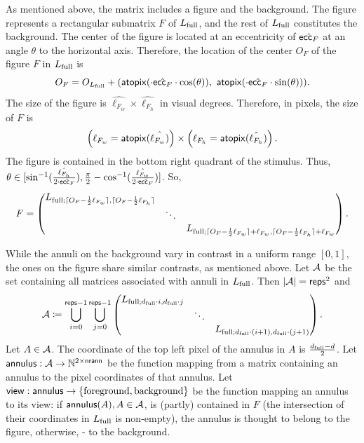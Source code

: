 As mentioned above, the matrix includes a figure and the background. The figure represents a rectangular submatrix $F$ of $L_{\mathrm{full}}$, and the rest of $L_{\mathrm{full}}$ constitutes the background. The center of the figure is located at an eccentricity of $\hat{\mathsf{ecc}_F}$ at an angle $\theta$ to the horizontal axis.
Therefore, the location of the center $O_F$ of the figure $F$ in $L_{\mathrm{full}}$ is
\begin{equation}
    O_F = O_{L_{\mathrm{full}}} + (\mathsf{atopix}( \cdot \hat{\mathsf{ecc}_F} \cdot \cos(\theta)), \ \mathsf{atopix}( \cdot \hat{\mathsf{ecc}_F} \cdot \sin(\theta))).
\end{equation}
The size of the figure is $\hat{\ell_{F_w}} \times \hat{\ell_{F_h}}$ in visual degrees. Therefore, in pixels, the size of $F$ is
\begin{equation}
    \left( \ell_{F_w} = \mathsf{atopix}(\hat{\ell_{F_w})} \right) \times \left( \ell_{F_h} = \mathsf{atopix}(\hat{\ell_{F_h}}) \right).
\end{equation}
The figure is contained in the bottom right quadrant of the stimulus. Thus, $\theta \in [\sin^{-1} (\frac{\hat{\ell_{F_h}}}{2 \cdot \hat{\mathsf{ecc}_F}}), \frac{\pi}{2} - \cos^{-1} (\frac{\hat{\ell_{F_w}}}{2 \cdot \hat{\mathsf{ecc}_F}})]$.  So,
\begin{equation}
    F =
    \begin{pmatrix}
        L_{\mathrm{full}; \lceil O_F - \frac{1}{2} \ell_{F_w}\rceil,  \lceil O_F - \frac{1}{2} \ell_{F_h}\rceil} &  &  \\
         & \ddots &  \\
         &  & L_{\mathrm{full}; \lceil O_F - \frac{1}{2} \ell_{F_w}\rceil + \ell_{F_w},  \lceil O_F - \frac{1}{2} \ell_{F_h}\rceil + \ell_{F_w}}
    \end{pmatrix}.
\end{equation}

While the annuli on the background vary in contrast in a uniform range $[0, 1]$, the ones on the figure share similar contrasts, as mentioned above. Let $\mathcal{A}$ be the set containing all matrices associated with annuli in $L_{\mathrm{full}}$. Then $|\mathcal{A}| = \mathsf{reps}^2$ and 
\begin{equation}
    \mathcal{A} \coloneqq \bigcup_{i = 0}^{\mathsf{reps} - 1} \bigcup_{j = 0}^{\mathsf{reps} - 1}
    \begin{pmatrix}
        L_{\mathrm{full}; d_{\mathrm{full}} \cdot i, d_{\mathrm{full}} \cdot j} &  &  \\
         & \ddots & \\
         &  & L_{\mathrm{full}; d_{\mathrm{full}} \cdot (i+1), d_{\mathrm{full}} \cdot (j+1)}
    \end{pmatrix}.
\end{equation}
Let $A \in \mathcal{A}$. The coordinate of the top left pixel of the annulus in $A$ is $\frac{d_{\mathrm{full}} - d}{2}$. Let $\mathsf{annulus}: \mathcal{A} \to \mathbb{N}^{2 \times \mathsf{nrann}}$ be the function mapping from a matrix containing an annulus to the pixel coordinates of that annulus. Let $\mathsf{view} : \mathsf{annulus} \to \{ \mathrm{foreground}, \mathrm{background} \}$ be the function mapping an annulus to its view: if $\mathsf{annulus}(A), A \in \mathcal{A}$, is (partly) contained in $F$ (the intersection of their coordinates in $L_{\mathrm{full}}$ is non-empty), the annulus is thought to belong to the figure, otherwise, - to the background. 

